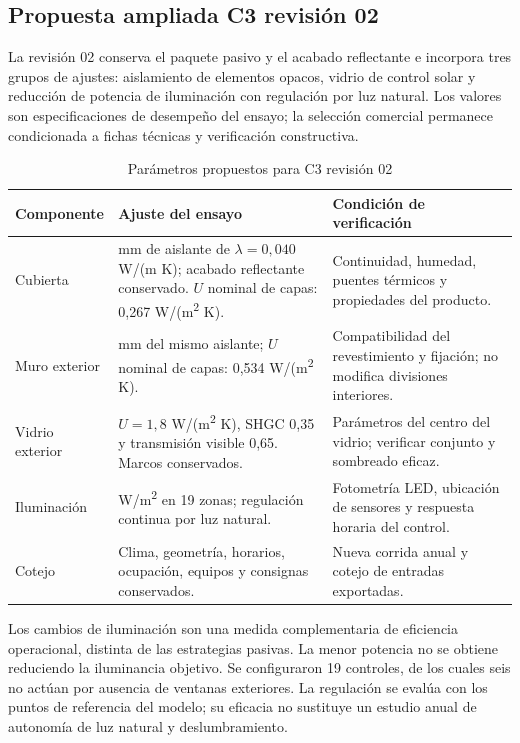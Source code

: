 \par\medskip
\subsection{Propuesta ampliada C3 revisión 02}
\label{sec:c3-revision02}
La revisión 02 conserva el paquete pasivo y el acabado reflectante e incorpora tres grupos de ajustes: aislamiento de elementos opacos, vidrio de control solar y reducción de potencia de iluminación con regulación por luz natural. Los valores son especificaciones de desempeño del ensayo; la selección comercial permanece condicionada a fichas técnicas y verificación constructiva.
\begin{table}[H]\centering
\caption{Parámetros propuestos para C3 revisión 02}
{\small\singlespacing\renewcommand{\arraystretch}{1.25}
\begin{tabular}{>{\raggedright\arraybackslash}p{2.4cm}>{\raggedright\arraybackslash}p{6.2cm}>{\raggedright\arraybackslash}p{4.7cm}}\toprule
Componente & Ajuste del ensayo & Condición de verificación \\ \midrule
Cubierta & 80 mm de aislante de $\lambda=0,040$ W/(m K); acabado reflectante conservado. $U$ nominal de capas: 0,267 W/(m\textsuperscript{2} K). & Continuidad, humedad, puentes térmicos y propiedades del producto. \\
Muro exterior & 60 mm del mismo aislante; $U$ nominal de capas: 0,534 W/(m\textsuperscript{2} K). & Compatibilidad del revestimiento y fijación; no modifica divisiones interiores. \\
Vidrio exterior & $U=1,8$ W/(m\textsuperscript{2} K), SHGC 0,35 y transmisión visible 0,65. Marcos conservados. & Parámetros del centro del vidrio; verificar conjunto y sombreado eficaz. \\
Iluminación & 8 W/m\textsuperscript{2} en 19 zonas; regulación continua por luz natural. & Fotometría LED, ubicación de sensores y respuesta horaria del control. \\
Cotejo & Clima, geometría, horarios, ocupación, equipos y consignas conservados. & Nueva corrida anual y cotejo de entradas exportadas. \\
\bottomrule\end{tabular}}
\end{table}
Los cambios de iluminación son una medida complementaria de eficiencia operacional, distinta de las estrategias pasivas. La menor potencia no se obtiene reduciendo la iluminancia objetivo. Se configuraron 19 controles, de los cuales seis no actúan por ausencia de ventanas exteriores. La regulación se evalúa con los puntos de referencia del modelo; su eficacia no sustituye un estudio anual de autonomía de luz natural y deslumbramiento.
